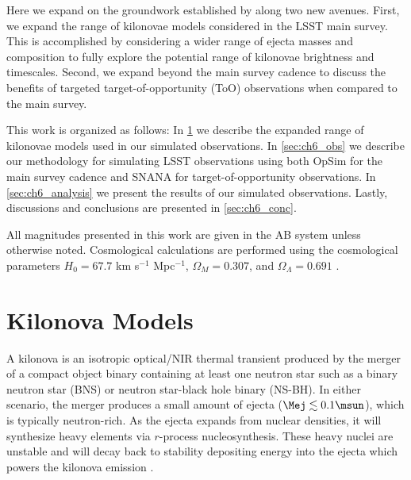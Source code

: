 Here we expand on the groundwork established by \citet{Scolnic+18} along two new avenues. First, we expand the range of kilonovae models considered in the LSST main survey. This is accomplished by considering a wider range of ejecta masses and composition to fully explore the potential range of kilonovae brightness and timescales. Second, we expand beyond the main survey cadence to discuss the benefits of targeted target-of-opportunity (ToO) observations when compared to the main survey.


This work is organized as follows: In \cref{sec:ch6_models} we describe the expanded range of kilonovae models used in our simulated observations. In \cref{sec:ch6_obs} we describe our methodology for simulating LSST observations using both OpSim for the main survey cadence and SNANA for target-of-opportunity observations. In \cref{sec:ch6_analysis} we present the results of our simulated observations. Lastly, discussions and conclusions are presented in \cref{sec:ch6_conc}.

All magnitudes presented in this work are given in the AB system unless otherwise noted. Cosmological calculations are performed using the cosmological parameters $H_0 = 67.7$ km s$^{-1}$ Mpc$^{-1}$, $\Omega_M = 0.307$, and $\Omega_{\Lambda} = 0.691$ \citep{Planck2016}.

\clearpage
\section{Kilonova Models}
\label{sec:ch6_models}
A kilonova is an isotropic optical/NIR thermal transient produced by the merger of a compact object binary containing at least one neutron star such as a binary neutron star (BNS) or neutron star-black hole binary (NS-BH). In either scenario, the merger produces a small amount of ejecta ($\Mej \lesssim 0.1 \msun$), which is typically neutron-rich. As the ejecta expands from nuclear densities, it will synthesize heavy elements via $r$-process nucleosynthesis. These heavy nuclei are unstable and will decay back to stability depositing energy into the ejecta which powers the kilonova emission \citep{LP98,Metzger+10,BarnesKasen13,TanakaHotokezaka13,Metzger2017}.

